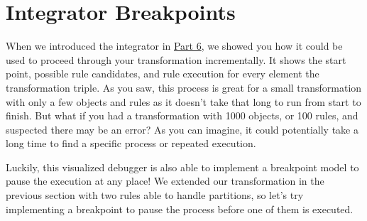 \newpage
\hypertarget{sec:breakpoints}{}
\section{Integrator Breakpoints}
\genHeader

When we introduced the integrator in \hyperlink{sec:app_integrator}{Part 6}, we showed you how it could be used to proceed through your transformation
incrementally. It shows the start point, possible rule candidates, and rule execution for every element the transformation triple. As you saw, this process is
great for a small transformation with only a few objects and rules as it doesn't take that long to run from start to finish. But what if you had a
transformation with 1000 objects, or 100 rules, and suspected there may be an error? As you can imagine, it could potentially take a long time to find a
specific process or repeated execution.

Luckily, this visualized debugger is also able to implement a breakpoint model to pause the execution at any place! We extended our transformation in
the previous section with two rules able to handle partitions, so let's try implementing a breakpoint to pause the process before one of them is executed.

